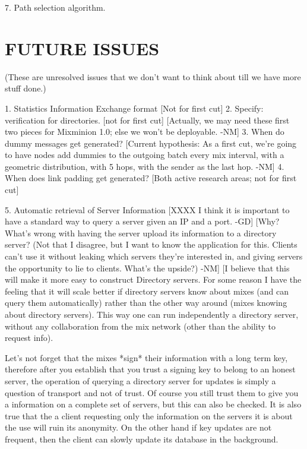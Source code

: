 7. Path selection algorithm.

\section{FUTURE ISSUES}
(These are unresolved issues that we don't want to think about till we
have more stuff done.)

1. Statistics Information Exchange format
   [Not for first cut]
2. Specify: verification for directories.
   [not for first cut]
   [Actually, we may need these first two pieces for Mixminion 1.0;
    else we won't be deployable. -NM]
3. When do dummy messages get generated?
   [Current hypothesis: As a first cut, we're going to have nodes add
    dummies to the outgoing batch every mix interval, with a geometric
    distribution, with 5 hops, with the sender as the last hop. -NM]
4. When does link padding get generated?
   [Both active research areas; not for first cut]

5. Automatic retrieval of Server Information
[XXXX I think it is important to have a standard way to query a server given 
      an IP and a port. -GD]
[Why? What's wrong with having the server upload its information to a
 directory server? (Not that I disagree, but I want to know the
 application for this.  Clients can't use it without leaking which
 servers they're interested in, and giving servers the opportunity to
 lie to clients.  What's the upside?) -NM]
[I believe that this will make it more easy to construct Directory servers. 
 For some reason I have the feeling that it will scale better if directory 
 servers know about mixes (and can query them automatically) rather than the 
 other way around (mixes knowing about directory servers). This way one can 
 run independently a directory server, without any collaboration from the mix
 network (other than the ability to request info). 

 Let's not forget that the
 mixes *sign* their information with a long term key, therefore after you 
 establish that you trust a signing key to belong to an honest server, the 
 operation of querying a directory server for updates is simply a question 
 of transport and not of trust. Of course you still trust them to give you a 
 information on a complete set of servers, but this can also be checked. 
 It is also true that the a client requesting only the information on the 
 servers it is about the use will ruin its anonymity. On the other hand if key
 updates are not frequent, then the client can slowly update its database in 
 the background.

